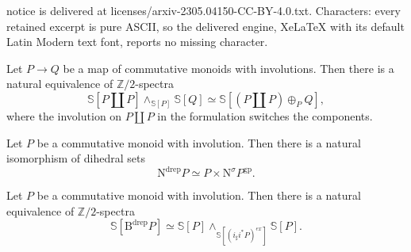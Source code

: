 \documentclass[10pt,a4paper]{amsart}
\newcommand{\Bdrep}{\mathrm{B}^\mathrm{drep}}
\newcommand{\Ndrep}{\mathrm{N}^\mathrm{drep}}
\newcommand{\Nsigma}{\mathrm{N}^\sigma}
\newcommand{\Sphere}{\mathbb{S}}
\newcommand{\Ztwo}{{\mathbb{Z}/2}}
\newcommand{\gp}{\mathrm{gp}}
\begin{document}
notice is delivered at licenses/arxiv-2305.04150-CC-BY-4.0.txt. Characters: every retained excerpt is pure ASCII, so the delivered engine, XeLaTeX with its default Latin Modern text font, reports no missing character.
\begin{lem}
\label{drep.6}
Let $P\to Q$ be a map of commutative monoids with involutions.
Then there is a natural equivalence of $\Ztwo$-spectra
\[
\Sphere[P\amalg P]\wedge_{\Sphere[P]}\Sphere[Q]
\simeq
\Sphere[(P\amalg P)\oplus_P Q],
\]
where the involution on $P\amalg P$ in the formulation switches the components.
\end{lem}

\begin{prop}
\label{dih.25}
Let $P$ be a commutative monoid with involution.
Then there is a natural isomorphism of dihedral sets
\[
\Ndrep P
\simeq
P\times \Nsigma P^\gp.
\]
\end{prop}

\begin{prop}
\label{dih.15}
Let $P$ be a commutative monoid with involution.
Then there is a natural equivalence of $\Ztwo$-spectra
\[
\Sphere[\Bdrep P]
\simeq
\Sphere[P]\wedge_{\Sphere[(i_\sharp i^*P)^{ex}]} \Sphere[P].
\]
\end{prop}
\end{document}
